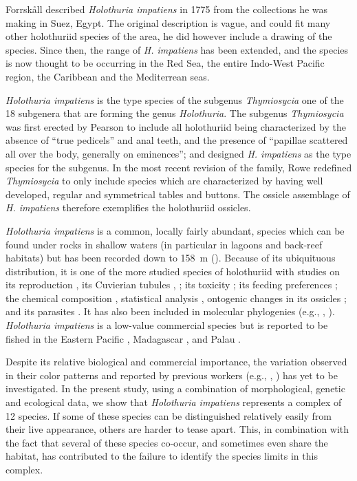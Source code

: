\documentclass{article}\usepackage[]{graphicx}\usepackage[]{color}
\begin{document}

Forrsk\r{a}ll described \textit{Holothuria impatiens} in 1775 from the
collections he was making in Suez, Egypt. The original description is vague, and
could fit many other holothuriid species of the area, he did however include a
drawing of the species. Since then, the range of \textit{H. impatiens} has been
extended, and the species is now thought to be occurring in the Red Sea, the
entire Indo-West Pacific region, the Caribbean and the Mediterrean seas.

\textit{Holothuria impatiens} is the type species of the subgenus
\textit{Thymiosycia} one of the 18 subgenera that are forming the genus
\textit{Holothuria}. The subgenus \textit{Thymiosycia} was first erected by
Pearson \cite{Pearson1915} to include all holothuriid being characterized by the
absence of ``true pedicels'' and anal teeth, and the presence of ``papillae
scattered all over the body, generally on eminences''; and designed
\textit{H. impatiens} as the type species for the subgenus. In the most recent
revision of the family, Rowe \cite{Rowe1969} redefined \textit{Thymiosycia} to
only include species which are characterized by having well developed, regular
and symmetrical tables and buttons. The ossicle assemblage of
\textit{H. impatiens} therefore exemplifies the holothuriid ossicles.

\textit{Holothuria impatiens} is a common, locally fairly abundant, species
which can be found under rocks in shallow waters (in particular in lagoons and
back-reef habitats) but has been recorded down to 158~m (\cite{Samyn2013}).
Because of its ubiquituous distribution, it is one of the more studied species
of holothuriid with studies on its reproduction \cite{Harriot1985}, its
Cuvierian tubules \cite{Flammang2002}, \cite{Becker+Flammang2010}; its toxicity
\cite{Bakus1974}; its feeding preferences \cite{Roberts1982}; the chemical
composition \cite{Hampton1958}, statistical analysis \cite{Hampton1959},
ontogenic changes in its ossicles \cite{Cutress1996}; and its parasites
\cite{Martens1994}.  It has also been included in molecular phylogenies (e.g.,
\cite{Lacey2005}, \cite{Honey-Escandon2012}). \textit{Holothuria impatiens} is a
low-value commercial species but is reported to be fished in the Eastern Pacific
\cite{Toral-Granda2008}, Madagascar \cite{Conand2007}, and Palau
\cite{Pakoa2009}.

Despite its relative biological and commercial importance, the variation
observed in their color patterns and reported by previous workers (e.g.,
\cite[p.178]{Clark1921}, \cite{Rowe+Richmond2004}) has yet to be
investigated. In the present study, using a combination of morphological,
genetic and ecological data, we show that \textit{Holothuria impatiens}
represents a complex of 12 species. If some of these species can be
distinguished relatively easily from their live appearance, others are harder to
tease apart. This, in combination with the fact that several of these species
co-occur, and sometimes even share the habitat, has contributed to the failure
to identify the species limits in this complex.
\end{document}
